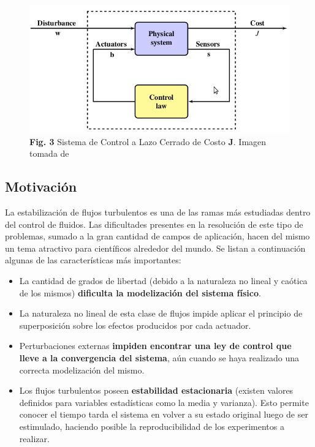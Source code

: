 \documentclass[a4paper,10pt]{article}
\begin{document}
        \begin{figure}[!Hhtb]
            \centering
            \includegraphics[width=12cm,origin=c]{Imagenes/control_loop.png}
            \caption{\textbf{Fig. 3} Sistema de Control a Lazo Cerrado de Costo \textbf{J}.
            Imagen tomada de \cite{Duriez2016}} \label{fig003}
        \end{figure}

        \subsection{Motivación} \label{sec:motiv}
        La estabilización de flujos turbulentos es una de las ramas más estudiadas dentro del control de fluidos. Las
        dificultades presentes en la resolución de este tipo de problemas, sumado a la gran cantidad de campos de aplicación, hacen del
        mismo un tema atractivo para científicos alrededor del mundo. Se listan a continuación algunas de las características más
        importantes:

        \begin{itemize}
            \item La cantidad de grados de libertad (debido a la naturaleza no lineal y caótica de los mismos) \textbf{dificulta la
            modelización del sistema físico}.
            \item La naturaleza no lineal de esta clase de flujos impide aplicar el principio de superposición sobre los efectos producidos
            por cada actuador.
            \item Perturbaciones externas \textbf{impiden encontrar una ley de control que lleve a la convergencia del sistema}, aún cuando 
            se haya realizado una correcta modelización del mismo.
            \item Los flujos turbulentos poseen \textbf{estabilidad estacionaria} (existen valores definidos para variables estadísticas
            como la media y varianza). Esto permite conocer el tiempo tarda el sistema en volver a su estado original luego de ser 
            estimulado, haciendo posible la reproducibilidad de los experimentos a realizar.
        \end{itemize}
\end{document}
